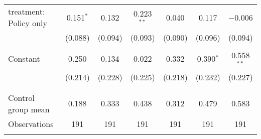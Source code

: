 \begin{tabular}{@{\extracolsep{5pt}}lcccccc}
 treatment: Policy only & 0.151$^{*}$ & 0.132 & 0.223$^{**}$ & 0.040 & 0.117 & $-$0.006 \\ 
  & (0.088) & (0.094) & (0.093) & (0.090) & (0.096) & (0.094) \\ 
  & & & & & & \\ 
 Constant & 0.250 & 0.134 & 0.022 & 0.332 & 0.390$^{*}$ & 0.558$^{**}$ \\ 
  & (0.214) & (0.228) & (0.225) & (0.218) & (0.232) & (0.227) \\ 
  & & & & & & \\ 
\hline \\[-1.8ex] 
Control group mean & 0.188 & 0.333 & 0.438 & 0.312 & 0.479 & 0.583 \\ 
Observations & 191 & 191 & 191 & 191 & 191 & 191 \\ 
\hline 
\hline \\[-1.8ex] 
\end{tabular} 
